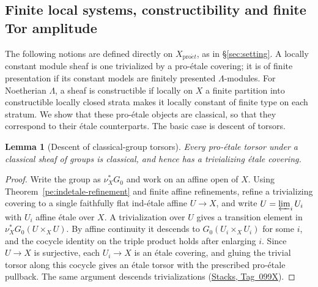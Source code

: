 \documentclass[11pt,a4paper]{article}
\numberwithin{equation}{section}
\newtheorem{lemma}[theorem]{Lemma}
\theoremstyle{definition}
\theoremstyle{remark}
\newcommand{\proet}{\mathrm{pro}\acute{e}t}
\newcommand{\stacks}[1]{\href{https://stacks.math.columbia.edu/tag/#1}{\textnormal{Stacks, Tag~#1}}}
\begin{document}
\subsection{Finite local systems, constructibility and finite Tor amplitude}
\label{pe:constructibility-section}
The following notions are defined directly on $X_{\proet}$, as in
\S\ref{sec:setting}. A locally constant module sheaf is one
trivialized by a pro-\'etale covering; it is of finite presentation if
its constant models are finitely presented $\Lambda$-modules. For
Noetherian $\Lambda$, a sheaf is constructible if locally on $X$ a
finite partition into constructible locally closed strata makes it
locally constant of finite type on each stratum. We show that these
pro-\'etale objects are classical, so that they correspond to their
\'etale counterparts. The basic case is descent of torsors.

\begin{lemma}[Descent of classical-group torsors]
\label{pe:torsor-comparison}
Every pro-\'etale torsor under a classical sheaf of groups is
classical, and hence has a trivializing \'etale covering.
\end{lemma}
\begin{proof}
Write the group as $\nu_X^*G_0$ and work on an affine open of $X$.
Using Theorem~\ref{pe:indetale-refinement} and finite affine
refinements, refine a trivializing covering to a single faithfully
flat ind-\'etale affine $U\to X$, and write $U=\varprojlim_iU_i$ with
$U_i$ affine \'etale over $X$. A trivialization over $U$ gives a
transition element in $\nu_X^*G_0(U\times_XU)$. By affine continuity
it descends to $G_0(U_i\times_XU_i)$ for some $i$, and the cocycle
identity on the triple product holds after enlarging $i$. Since
$U\to X$ is surjective, each $U_i\to X$ is an \'etale covering, and
gluing the trivial torsor along this cocycle gives an \'etale torsor
with the prescribed pro-\'etale pullback. The same argument descends
trivializations (\stacks{099X}).
\end{proof}
\end{document}
